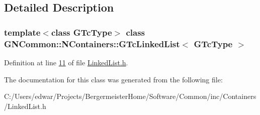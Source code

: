 \subsection{Detailed Description}
\subsubsection*{template$<$class G\+Tc\+Type$>$\newline
class G\+N\+Common\+::\+N\+Containers\+::\+G\+Tc\+Linked\+List$<$ G\+Tc\+Type $>$}



Definition at line \mbox{\hyperlink{_linked_list_8h_source_l00011}{11}} of file \mbox{\hyperlink{_linked_list_8h_source}{Linked\+List.\+h}}.



The documentation for this class was generated from the following file\+:\begin{DoxyCompactItemize}
\item 
C\+:/\+Users/edwar/\+Projects/\+Bergermeister\+Home/\+Software/\+Common/inc/\+Containers/Linked\+List.\+h\end{DoxyCompactItemize}
